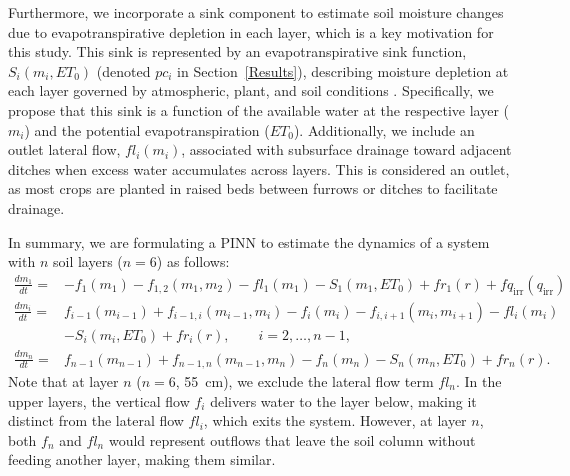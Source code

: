 \documentclass[pdflatex,sn-nature]{sn-jnl}%
\theoremstyle{thmstyleone}%
\theoremstyle{thmstyletwo}%
\theoremstyle{thmstylethree}%
\begin{document}
Furthermore, we incorporate a sink component to estimate soil moisture changes due to evapotranspirative depletion in each layer, which is a key motivation for this study. This sink is represented by an evapotranspirative sink function, $S_i (m_i, ET_0)$ (denoted $pc_i$ in Section~\ref{Results}), describing moisture depletion at each layer governed by atmospheric, plant, and soil conditions \cite{swap2024}. Specifically, we propose that this sink is a function of the available water at the respective layer ($m_i$) and the potential evapotranspiration ($ET_0$).
Additionally, we include an outlet lateral flow, $fl_i (m_i)$, associated with subsurface drainage toward adjacent ditches when excess water accumulates across layers. This is considered an outlet, as most crops are planted in raised beds between furrows or ditches to facilitate drainage.

In summary, we are formulating a PINN to estimate the dynamics of a system with $n$ soil layers ($n=6$) as follows:
\begin{equation}
\label{system}
\begin{aligned}
\frac{d{m}_1}{dt} = & - f_1({m}_1) - f_{1,2}({m}_1,{m}_2) - fl_1(m_1) - S_1({m}_1, ET_0) + fr_1(r) + fq_{\mathrm{irr}}(q_{\mathrm{irr}})\\
\frac{d{m}_i}{dt} = & f_{i-1}({m}_{i-1}) + f_{i-1,i}({m}_{i-1},{m}_i) - f_i({m}_i)- f_{i,i+1}({m}_i,{m}_{i+1}) - fl_i(m_i) \\ 
 & - S_i({m}_i, ET_0) + fr_i(r), \qquad i = 2,\dots,n-1,\\
\frac{d{m}_n}{dt} = & f_{n-1}({m}_{n-1}) + f_{n-1,n}({m}_{n-1},{m}_n) - f_n({m}_n) - S_n({m}_n, ET_0) + fr_n(r).
\end{aligned}
\end{equation}
Note that at layer $n$ ($n=6$, \SI{55}{cm}), we exclude the lateral flow term $fl_n$. In the upper layers, the vertical flow $f_i$ delivers water to the layer below, making it distinct from the lateral flow $fl_i$, which exits the system. However, at layer $n$, both $f_n$ and $fl_n$ would represent outflows that leave the soil column without feeding another layer, making them similar.
\end{document}
